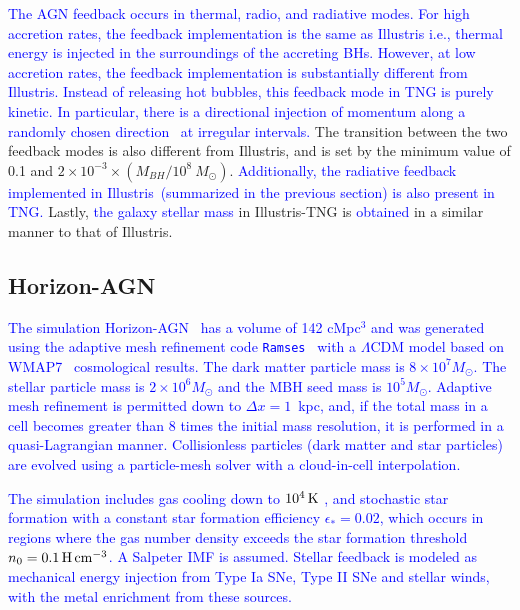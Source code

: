 \documentclass[twocolumn]{aastex631}
\newcommand{\blue}[1]{\textcolor{blue}{#1}}
\newcommand{\aklant}[1]{\textcolor{blue}{#1}}
\begin{document}
\aklant{The AGN feedback occurs in thermal, radio, and radiative modes. For high accretion rates, the feedback implementation is the same as Illustris i.e., thermal energy is injected in the surroundings of the accreting BHs. However, at low accretion rates, the feedback implementation is substantially different from Illustris. Instead of releasing hot bubbles, this feedback mode in TNG is purely kinetic. In particular, there is a directional injection of momentum along a randomly chosen direction~\citep{2017MNRAS.465.3291W, 2018MNRAS.479.4056W} at irregular intervals.} The transition between the two feedback modes is also different from Illustris, and is set by the minimum value of 0.1 and $2 \times 10 ^{-3} \times (M_{BH} / 10^8~M_{\odot})$. \aklant{Additionally, the radiative feedback implemented in Illustris~(summarized in the previous section) is also present in TNG.} Lastly, \blue{the galaxy stellar mass} in Illustris-TNG is \blue{obtained} in a similar manner to that of Illustris.

\subsection{Horizon-AGN}\label{subsec:Horizon}

\blue{The simulation Horizon-AGN~\citep{2014MNRAS.444.1453D, 2016MNRAS.463.3948D} has a volume of 142 cMpc$^3$ and was generated using the adaptive mesh refinement code {\tt Ramses}~\citep{2002A&A...385..337T} with a $\Lambda$CDM model based on WMAP7~\citep{2011ApJS..192...18K} cosmological results. The dark matter particle mass is $8\times 10^7 M_{\odot}$. The stellar particle mass is $2\times 10^6 M_{\odot}$ and the MBH seed mass is $10^5 M_{\odot}$. Adaptive mesh refinement is permitted down to $\Delta x=1$~kpc, and, if the total mass in a cell becomes greater than 8 times the initial mass resolution, it is performed in a quasi-Lagrangian manner. Collisionless particles (dark matter and star particles) are evolved using a particle-mesh solver with a cloud-in-cell interpolation. }

\blue{The simulation includes gas cooling down to $10^4\, \rm K$ \citep{sutherland&dopita93}, and stochastic star formation with a constant star formation efficiency $\epsilon_*=0.02$, which occurs in regions where the gas number density exceeds the star formation threshold $n_0 = 0.1\,\rm H\, cm^{-3}$. A Salpeter IMF is assumed. Stellar feedback is modeled as mechanical energy injection from Type Ia SNe, Type II SNe and stellar winds, with the metal enrichment from these sources. }
\end{document}
